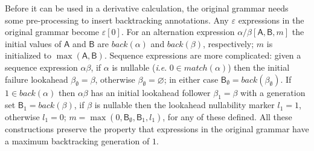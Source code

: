 \documentclass[submission,copyright,creativecommons]{eptcs}
\newcommand{\g}[1]{\mathsf{#1}}
\newcommand{\ie}{\textit{i}.\textit{e}.}
\begin{document}
Before it can be used in a derivative calculation, the original grammar needs some pre-processing to insert backtracking annotations. 
Any $\varepsilon$ expressions in the original grammar become $\varepsilon[0]$. 
For an alternation expression $\alpha/\beta[\g{A}, \g{B}, m]$ the initial values of $\g{A}$ and $\g{B}$ are $back(\alpha)$ and $back(\beta)$, respectively; $m$ is initialized to $\max(\g{A}, \g{B})$. 
Sequence expressions are more complicated: given a sequence expression $\alpha\beta$, if $\alpha$ is nullable (\ie{} $0 \in match(\alpha)$) then the initial failure lookahead $\beta_\emptyset = \beta$, otherwise $\beta_\emptyset = \varnothing$; in either case $\g{B}_\emptyset = back(\beta_\emptyset)$. 
If $1 \in back(\alpha)$ then $\alpha\beta$ has an initial lookahead follower $\beta_1 = \beta$ with a generation set $\g{B}_1 = back(\beta)$, if $\beta$ is nullable then the lookahead nullability marker $l_1 = 1$, otherwise $l_1 = 0$; $m = \max(0, \g{B}_\emptyset, \g{B}_1, l_1)$, for any of these defined.
All these constructions preserve the property that expressions in the original grammar have a maximum backtracking generation of $1$.
\end{document}
